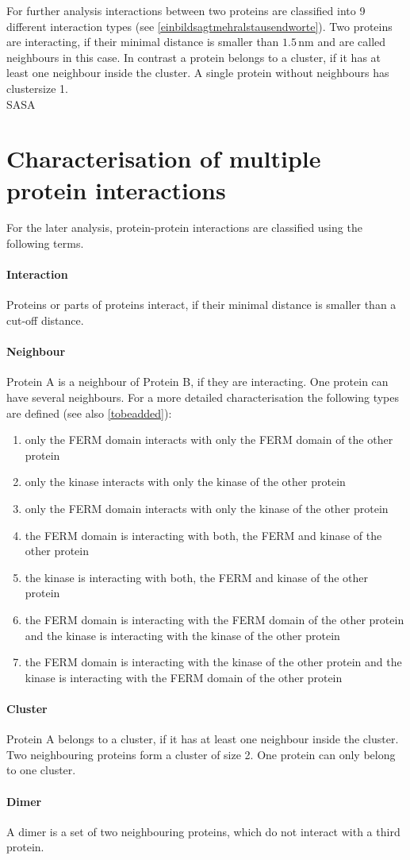 For further analysis interactions between two proteins are classified into 9 different interaction types (see \autoref{einbildsagtmehralstausendworte}). Two proteins are interacting, if their minimal distance is smaller than $1.5\,\si{\nano\metre}$ and are called neighbours in this case. In contrast a protein belongs to a cluster, if it has at least one neighbour inside the cluster. A single protein without neighbours has clustersize 1.\\
SASA
\section{Characterisation of multiple protein interactions}
For the later analysis, protein-protein interactions are classified using the following terms.
\paragraph{Interaction} Proteins or parts of proteins interact, if their minimal distance is smaller than a cut-off distance.
\paragraph{Neighbour} Protein A is a neighbour of Protein B, if they are interacting. One protein can have several neighbours. For a more detailed characterisation the following types are defined (see also \autoref{tobeadded}):
\begin{enumerate}[label={type \theenumi:}, leftmargin=*]
	\item only the FERM domain interacts with only the FERM domain of the other protein
	\item only the kinase interacts with only the kinase of the other protein
	\item only the FERM domain interacts with only the kinase of the other protein
	\item the FERM domain is interacting with both, the FERM and kinase of the other protein
	\item the kinase is interacting with both, the FERM and kinase of the other protein
	\item the FERM domain is interacting with the FERM domain of the other protein and the kinase is interacting with the kinase of the other protein
	\item the FERM domain is interacting with the kinase of the other protein and the kinase is interacting with the FERM domain of the other protein
\end{enumerate}
\paragraph{Cluster} Protein A belongs to a cluster, if it has at least one neighbour inside the cluster. Two neighbouring proteins form a cluster of size 2. One protein can only belong to one cluster.
\paragraph{Dimer} A dimer is a set of two neighbouring proteins, which do not interact with a third protein.